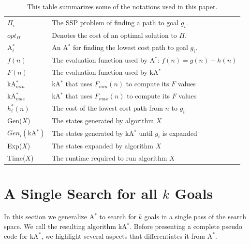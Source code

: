 \documentclass{aicom2e}
\newcommand{\astar}{A$^*$}
\newcommand{\kastar}{kA$^*$}
\newcommand{\kastarmin}{kA$^*_{min}$}
\newcommand{\kastarmax}{kA$^*_{max}$}
\newcommand{\astari}[1]{A$^*_#1$}
\newcommand{\minf}{$F_{min}(n)$}
\newcommand{\maxf}{$F_{max}(n)$}
\newcommand{\open}{\textsc{Open}}
\begin{document}
\begin{table}
	\scriptsize
\begin{tabular}{|m{1cm}|m{5.5cm}|}
        \hline
		$\Pi_i$ 	& The SSP problem of finding a path to goal $g_i$. \\
        $opt_\Pi$ 	& Denotes the cost of an optimal solution to $\Pi$.\\
        \astari{i}  & An \astar{} for finding the lowest cost path to goal $g_i$. \\
        $f(n)$      & The evaluation function used by \astar{}: $f(n)=g(n)+h(n)$ \\
		$F(n)$      & The evaluation function used by \kastar{} \\
		
        \kastarmin{} & \kastar{} that uses \minf{} to compute its $F$ values\\		
        \kastarmax{} & \kastar{} that uses \maxf{} to compute its $F$ values\\		
        $h^*_i(n)$ & The cost of the lowest cost path from $n$ to $g_i$\\
        Gen($X$)    & The states generated by algorithm $X$ \\
        $Gen_i(\text{\kastar{}})$ & The states generated by \kastar{} until $g_i$ is expanded \\
        Exp($X$) 	& The states expanded by algorithm $X$ \\
        Time($X$)   & The runtime required to run algorithm $X$ \\

        \hline
    \end{tabular}
\caption{This table summarizes some of the notations used in this paper.}
\label{tab:notations}
\end{table}


\section{A Single Search for all  $k$ Goals}
\label{sec:one-k-goal-search}

In this section we generalize \astar{} to search for $k$ goals in a single pass of the search space. We
call the resulting algorithm \kastar{}. Before presenting a complete pseudo
code for \kastar{}, we highlight several aspects that differentiates it from \astar{}.
\end{document}
